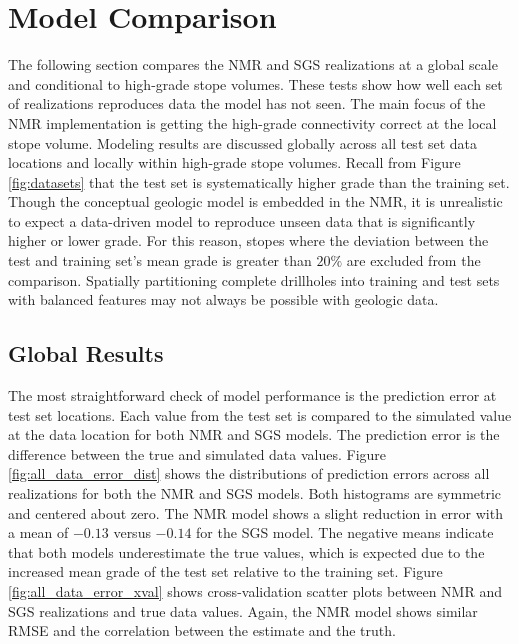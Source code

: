 \FloatBarrier
\section{Model Comparison}
\label{sec:06compare}

The following section compares the \gls{NMR} and \gls{SGS} realizations at a global scale and conditional to high-grade stope volumes. These tests show how well each set of realizations reproduces data the model has not seen. The main focus of the \gls{NMR} implementation is getting the high-grade connectivity correct at the local stope volume. Modeling results are discussed globally across all test set data locations and locally within high-grade stope volumes. Recall from Figure \ref{fig:datasets} that the test set is systematically higher grade than the training set. Though the conceptual geologic model is embedded in the \gls{NMR}, it is unrealistic to expect a data-driven model to reproduce unseen data that is significantly higher or lower grade. For this reason, stopes where the deviation between the test and training set's mean grade is greater than $20\%$ are excluded from the comparison. Spatially partitioning complete drillholes into training and test sets with balanced features may not always be possible with geologic data.

\subsection{Global Results}
\label{subsec:06global}

The most straightforward check of model performance is the prediction error at test set locations. Each value from the test set is compared to the simulated value at the data location for both \gls{NMR} and \gls{SGS} models. The prediction error is the difference between the true and simulated data values. Figure \ref{fig:all_data_error_dist} shows the distributions of prediction errors across all realizations for both the \gls{NMR} and \gls{SGS} models. Both histograms are symmetric and centered about zero. The \gls{NMR} model shows a slight reduction in error with a mean of $-0.13$ versus $-0.14$ for the \gls{SGS} model. The negative means indicate that both models underestimate the true values, which is expected due to the increased mean grade of the test set relative to the training set. Figure \ref{fig:all_data_error_xval} shows cross-validation scatter plots between \gls{NMR} and \gls{SGS} realizations and true data values. Again, the \gls{NMR} model shows similar \gls{RMSE} and the correlation between the estimate and the truth.

